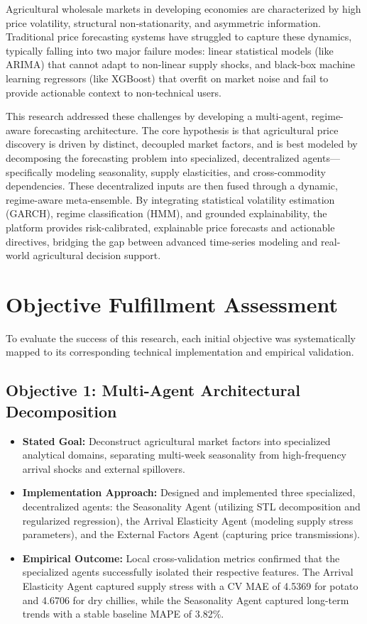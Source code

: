 \documentclass[12pt,a4paper]{report}
\theoremstyle{definition}
\theoremstyle{remark}
\begin{document}
Agricultural wholesale markets in developing economies are characterized by high price volatility, structural non-stationarity, and asymmetric information. Traditional price forecasting systems have struggled to capture these dynamics, typically falling into two major failure modes: linear statistical models (like ARIMA) that cannot adapt to non-linear supply shocks, and black-box machine learning regressors (like XGBoost) that overfit on market noise and fail to provide actionable context to non-technical users. 

This research addressed these challenges by developing a multi-agent, regime-aware forecasting architecture. The core hypothesis is that agricultural price discovery is driven by distinct, decoupled market factors, and is best modeled by decomposing the forecasting problem into specialized, decentralized agents—specifically modeling seasonality, supply elasticities, and cross-commodity dependencies. These decentralized inputs are then fused through a dynamic, regime-aware meta-ensemble. By integrating statistical volatility estimation (GARCH), regime classification (HMM), and grounded explainability, the platform provides risk-calibrated, explainable price forecasts and actionable directives, bridging the gap between advanced time-series modeling and real-world agricultural decision support.

\section{Objective Fulfillment Assessment}

To evaluate the success of this research, each initial objective was systematically mapped to its corresponding technical implementation and empirical validation.

\subsection{Objective 1: Multi-Agent Architectural Decomposition}
\begin{itemize}
    \item \textbf{Stated Goal:} Deconstruct agricultural market factors into specialized analytical domains, separating multi-week seasonality from high-frequency arrival shocks and external spillovers.
    \item \textbf{Implementation Approach:} Designed and implemented three specialized, decentralized agents: the Seasonality Agent (utilizing STL decomposition and regularized regression), the Arrival Elasticity Agent (modeling supply stress parameters), and the External Factors Agent (capturing price transmissions).
    \item \textbf{Empirical Outcome:} Local cross-validation metrics confirmed that the specialized agents successfully isolated their respective features. The Arrival Elasticity Agent captured supply stress with a CV MAE of 4.5369 for potato and 4.6706 for dry chillies, while the Seasonality Agent captured long-term trends with a stable baseline MAPE of 3.82\%.
\end{itemize}
\end{document}
